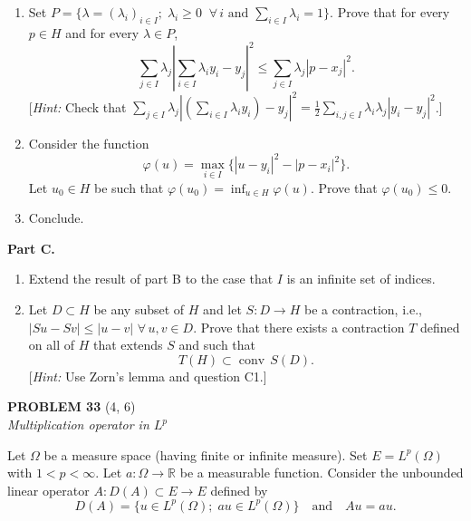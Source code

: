 \documentclass[12pt]{article}
\newcommand{\abs}[1]{\left|#1\right|}
\newcommand{\R}{\mathbb{R}}
\begin{document}
\begin{enumerate}
\item Set $P = \{\lambda = (\lambda_i)_{i \in I};\; \lambda_i \ge 0\;\;\forall\, i \text{ and } \sum_{i \in I}\lambda_i = 1\}$.
Prove that for every $p \in H$ and for every $\lambda \in P$,
\[
\sum_{j \in I} \lambda_j \left\lvert \sum_{i \in I}\lambda_i y_i - y_j\right\rvert^2
\le \sum_{j \in I} \lambda_j \abs{p - x_j}^2.
\]
[\textit{Hint:} Check that $\sum_{j \in I}\lambda_j \abs{(\sum_{i \in I}\lambda_i y_i) - y_j}^2
= \tfrac{1}{2}\sum_{i,j \in I}\lambda_i\lambda_j\abs{y_i - y_j}^2$.]
 
\item Consider the function
\[
\varphi(u) = \max_{i \in I}\{\abs{u - y_i}^2 - \abs{p - x_i}^2\}.
\]
Let $u_0 \in H$ be such that $\varphi(u_0) = \inf_{u \in H}\varphi(u)$. Prove that $\varphi(u_0) \le 0$.
 
 
\item Conclude.
\end{enumerate}
 
\noindent\textbf{Part C.}
 
\begin{enumerate}
\item Extend the result of part B to the case that $I$ is an infinite set of indices.
 
\item Let $D \subset H$ be any subset of $H$ and let $S : D \to H$ be a contraction, i.e.,
$\abs{Su - Sv} \le \abs{u-v}$ $\forall\, u, v \in D$.
Prove that there exists a contraction $T$ defined on all of $H$ that extends $S$ and
such that
\[
T(H) \subset \operatorname{conv}\, S(D).
\]
[\textit{Hint:} Use Zorn's lemma and question C1.]
\end{enumerate}
 
\bigskip
 
\noindent\textbf{PROBLEM 33} (4, 6)\\[4pt]
\textit{Multiplication operator in $L^p$}
 
\medskip
 
Let $\Omega$ be a measure space (having finite or infinite measure). Set $E = L^p(\Omega)$
with $1 < p < \infty$. Let $a : \Omega \to \R$ be a measurable function. Consider the
unbounded linear operator $A : D(A) \subset E \to E$ defined by
\[
D(A) = \{u \in L^p(\Omega);\; au \in L^p(\Omega)\} \quad \text{and} \quad Au = au.
\]
 
\end{document}
